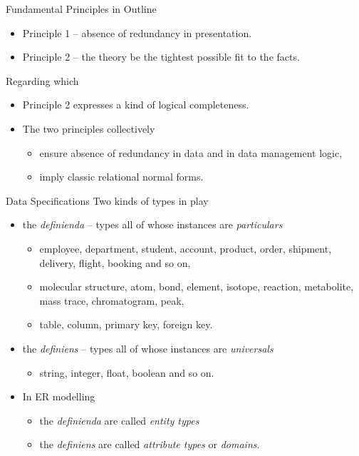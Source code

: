 

\begin{frame}{Fundamental Principles in Outline}
\begin{itemize}
    \item Principle 1 -- absence of redundancy in presentation.
    \item Principle 2 -- the theory be the tightest possible fit to the facts.
\end{itemize}

Regarding which
\begin{itemize}
    \item Principle 2 expresses a kind of logical completeness.
    \item The two principles collectively
    \begin{itemize}
        \item ensure absence of redundancy in data and in data management logic,
        \item imply classic relational normal forms.
    \end{itemize}
\end{itemize}
\end{frame}

\begin{frame}{Data Specifications}
Two kinds of types in play
\begin{itemize}
\item  the \textit{definienda} -- types all of whose instances are \textit{particulars}
\begin{itemize}
\item employee, department, student, account, product, order, shipment, delivery, flight, booking and so on,
\item molecular structure, atom, bond, element, isotope, reaction, metabolite, mass trace, chromatogram, peak,
\item table, column, primary key, foreign key.
\end{itemize}
\pause 
\item  the \textit{definiens}  -- types all of whose instances are \textit{universals}
\begin{itemize}
       \item string, integer, float, boolean and so on.
\end{itemize}
\end{itemize}
\pause
\begin{itemize}
\item In ER modelling 
\begin{itemize}
\item the \textit{definienda} are called \textit{entity types}
\item the \textit{definiens} are called \textit{attribute types} or \textit{domains}.
\end{itemize}
\end{itemize}
\end{frame}

